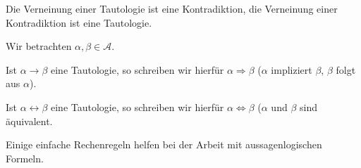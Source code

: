 \begin{notiz} Die Verneinung einer Tautologie ist eine Kontradiktion, die Verneinung einer Kontradiktion ist 
eine Tautologie.
\end{notiz}

\begin{definition} Wir betrachten $\alpha, \beta \in \mathcal{A}$. 

Ist $\alpha \rightarrow \beta$ eine Tautologie, so 
schreiben wir hierfür $\alpha \Longrightarrow \beta$ ($\alpha$ impliziert $\beta$, $\beta$ folgt aus $\alpha$).

Ist $\alpha \leftrightarrow \beta$ eine Tautologie, so schreiben wir hierfür $\alpha \iff \beta$ ($\alpha$ 
und $\beta$ sind äquivalent.
\end{definition}

\bigbreak
Einige einfache Rechenregeln helfen bei der Arbeit mit aussagenlogischen Formeln.

